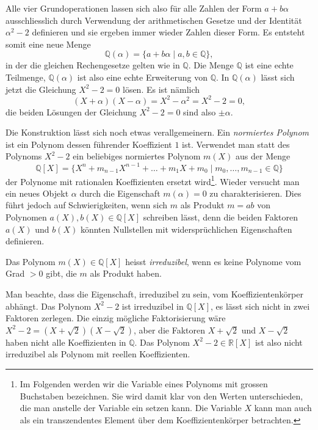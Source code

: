 Alle vier Grundoperationen lassen sich also für alle Zahlen der Form 
$a+b\alpha$ ausschliesslich durch Verwendung der arithmetischen Gesetze
und der Identität $\alpha^2-2$ definieren und sie ergeben immer wieder
Zahlen dieser Form.
Es entsteht somit eine neue Menge
\[
\mathbb{Q}(\alpha)
=
\{a+b\alpha\mid a,b\in\mathbb{Q}\},
\]
in der die gleichen Rechengesetze gelten wie in $\mathbb{Q}$.
Die Menge $\mathbb{Q}$ ist eine echte Teilmenge, $\mathbb{Q}(\alpha)$
ist also eine echte Erweiterung von $\mathbb{Q}$.
In $\mathbb{Q}(\alpha)$ lässt sich jetzt die Gleichung $X^2-2=0$ lösen.
Es ist nämlich
\[
(X+\alpha)(X-\alpha)
=
X^2-\alpha^2
=
X^2 - 2
=
0,
\]
die beiden Lösungen der Gleichung $X^2-2=0$ sind also $\pm\alpha$.

Die Konstruktion lässt sich noch etwas verallgemeinern.
Ein \emph{normiertes Polynom} ist ein Polynom dessen führender Koeffizient
%
%
$1$ ist.
Verwendet man statt des Polynoms $X^2-2$ ein beliebiges normiertes
Polynom $m(X)$ aus der Menge
\[
\mathbb{Q}[X]
=
\{
X^n+m_{n-1}X^{n-1}+\dots+m_1X+m_0 
\mid
m_0,\dots,m_{n-1}\in\mathbb{Q}
\}
\]
der Polynome mit rationalen Koeffizienten ersetzt wird\footnote{Im Folgenden
werden wir die Variable eines Polynoms mit grossen Buchstaben bezeichnen.
Sie wird damit klar von den Werten unterschieden, die man anstelle der
Variable ein setzen kann.
Die Variable $X$ kann man auch als ein transzendentes Element über dem
Koeffizientenkörper betrachten.
}.
Wieder versucht man ein neues Objekt $\alpha$ durch die Eigenschaft
$m(\alpha)=0$ zu charakterisieren.
Dies führt jedoch auf Schwierigkeiten, wenn sich $m$ als Produkt
$m=ab$ von Polynomen $a(X),b(X)\in\mathbb{Q}[X]$ schreiben lässt,
denn die beiden Faktoren $a(X)$ und $b(X)$ könnten Nullstellen mit
widersprüchlichen Eigenschaften definieren.

\begin{definition}
Das Polynom $m(X)\in\mathbb{Q}[X]$ heisst \emph{irreduzibel}, wenn es keine
%
Polynome vom Grad $>0$ gibt, die $m$ als Produkt haben.
\end{definition}

Man beachte, dass die Eigenschaft, irreduzibel zu sein, vom
Koeffizientenkörper abhängt.
Das Polynom $X^2-2$ ist irreduzibel in $\mathbb{Q}[X]$, es lässt sich
nicht in zwei Faktoren zerlegen.
Die einzig mögliche Faktorisierung wäre $X^2-2=(X+\!\sqrt{2})(X-\!\sqrt{2})$,
aber die Faktoren $X+\!\sqrt{2}$ und $X-\!\sqrt{2}$ haben nicht
alle Koeffizienten in $\mathbb{Q}$.
Das Polynom $X^2-2\in\mathbb{R}[X]$ ist also nicht irreduzibel als Polynom
mit reellen Koeffizienten.

